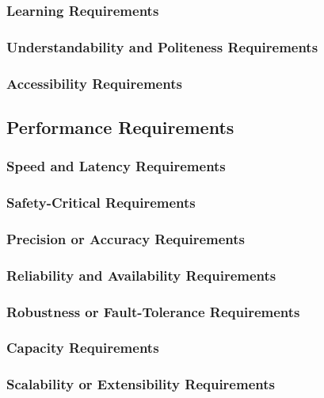 \documentclass[12pt, titlepage]{article}
\begin{document}
\subsubsection{Learning Requirements}


\subsubsection{Understandability and Politeness Requirements}


\subsubsection{Accessibility Requirements}



\subsection{Performance Requirements}
\subsubsection{Speed and Latency Requirements}


\subsubsection{Safety-Critical Requirements}


\subsubsection{Precision or Accuracy Requirements}


\subsubsection{Reliability and Availability Requirements}


\subsubsection{Robustness or Fault-Tolerance Requirements}


\subsubsection{Capacity Requirements}


\subsubsection{Scalability or Extensibility Requirements}
\end{document}
